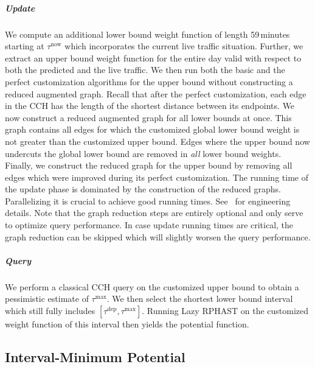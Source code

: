\documentclass[a4paper,UKenglish,cleveref, autoref, thm-restate]{lipics-v2021}
\newcommand*{\tdep}{\tau^{\operatorname{dep}}}
\newcommand*{\tmax}{\tau^{\max}}
\begin{document}
\subparagraph{Update}
We compute an additional lower bound weight function of length 59\,minutes starting at $\tau^{\operatorname{now}}$ which incorporates the current live traffic situation.
Further, we extract an upper bound weight function for the entire day valid with respect to both the predicted and the live traffic.
We then run both the basic and the perfect customization algorithms for the upper bound without constructing a reduced augmented graph.
Recall that after the perfect customization, each edge in the CCH has the length of the shortest distance between its endpoints.
We now construct a reduced augmented graph for all lower bounds at once.
This graph contains all edges for which the customized global lower bound weight is not greater than the customized upper bound.
Edges where the upper bound now undercuts the global lower bound are removed in \emph{all} lower bound weights.
Finally, we construct the reduced graph for the upper bound by removing all edges which were improved during its perfect customization.
The running time of the update phase is dominated by the construction of the reduced graphs.
Parallelizing it is crucial to achieve good running times.
See~\cite{bsw-rttau-19} for engineering details.
Note that the graph reduction steps are entirely optional and only serve to optimize query performance.
In case update running times are critical, the graph reduction can be skipped which will slightly worsen the query performance.

\subparagraph{Query}
We perform a classical CCH query on the customized upper bound to obtain a pessimistic estimate of $\tmax$.
We then select the shortest lower bound interval which still fully includes $[\tdep,\tmax]$.
Running Lazy RPHAST on the customized weight function of this interval then yields the potential function.


\subsection{Interval-Minimum Potential}
\end{document}
